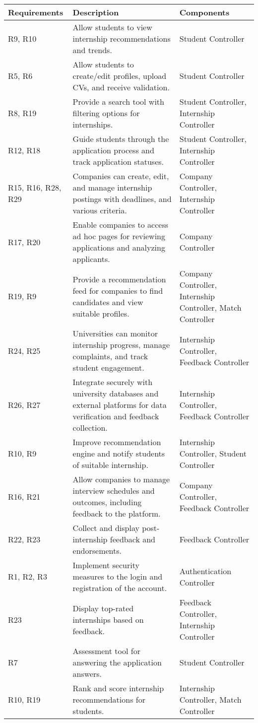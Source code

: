 \begin{longtable}{|p{3cm}|p{5cm}|p{4cm}|}
\hline
\textbf{Requirements} & \textbf{Description} & \textbf{Components} \\
\hline

R9, R10 & Allow students to view internship recommendations and trends. & Student Controller \\
\hline
R5, R6 & Allow students to create/edit profiles, upload CVs, and receive validation. & Student Controller \\
\hline
R8, R19 & Provide a search tool with filtering options for internships. & Student Controller, Internship Controller \\
\hline
R12, R18 & Guide students through the application process and track application statuses. & Student Controller, Internship Controller \\
\hline
R15, R16, R28, R29 & Companies can create, edit, and manage internship postings with deadlines, and various criteria. & Company Controller, Internship Controller \\
\hline
R17, R20 & Enable companies to access ad hoc pages for reviewing applications and analyzing applicants. & Company Controller \\
\hline
R19, R9 & Provide a recommendation feed for companies to find candidates and view suitable profiles. & Company Controller, Internship Controller, Match Controller \\
\hline
R24, R25 & Universities can monitor internship progress, manage complaints, and track student engagement. & Internship Controller, Feedback Controller \\
\hline
R26, R27 & Integrate securely with university databases and external platforms for data verification and feedback collection. & Internship Controller, Feedback Controller \\
\hline
R10, R9 & Improve recommendation engine and notify students of suitable internship. & Internship Controller, Student Controller \\
\hline
R16, R21 & Allow companies to manage interview schedules and outcomes, including feedback to the platform. & Company Controller, Feedback Controller \\
\hline
R22, R23 & Collect and display post-internship feedback and endorsements. & Feedback Controller \\
\hline
R1, R2, R3 & Implement security measures to the login and registration of the account. & Authentication Controller \\
\hline
R23 & Display top-rated internships based on feedback. & Feedback Controller, Internship Controller \\
\hline
R7 & Assessment tool for answering the application answers. & Student Controller \\
\hline
R10, R19 & Rank and score internship recommendations for students. & Internship Controller, Match Controller \\
\hline
\end{longtable}
